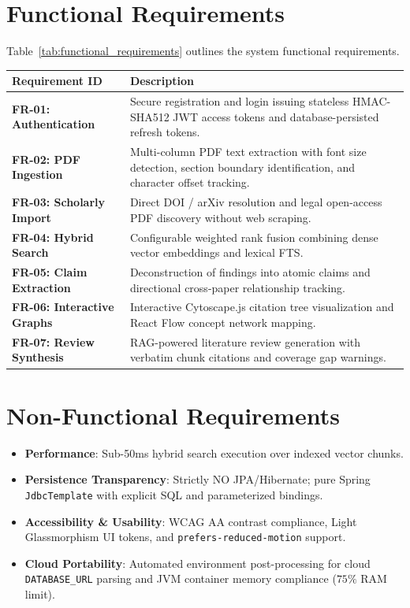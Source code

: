 \documentclass[11pt,a4paper,titlepage]{report}
\begin{document}
\section{Functional Requirements}
Table~\ref{tab:functional_requirements} outlines the system functional requirements.

\begin{center}
\label{tab:functional_requirements}
\vspace{3pt}
\begin{tabularx}{\textwidth}{lX}
\toprule
\textbf{Requirement ID} & \textbf{Description} \\
\midrule
\textbf{FR-01: Authentication} & Secure registration and login issuing stateless HMAC-SHA512 JWT access tokens and database-persisted refresh tokens. \\
\textbf{FR-02: PDF Ingestion} & Multi-column PDF text extraction with font size detection, section boundary identification, and character offset tracking. \\
\textbf{FR-03: Scholarly Import} & Direct DOI / arXiv resolution and legal open-access PDF discovery without web scraping. \\
\textbf{FR-04: Hybrid Search} & Configurable weighted rank fusion combining dense vector embeddings and lexical FTS. \\
\textbf{FR-05: Claim Extraction} & Deconstruction of findings into atomic claims and directional cross-paper relationship tracking. \\
\textbf{FR-06: Interactive Graphs} & Interactive Cytoscape.js citation tree visualization and React Flow concept network mapping. \\
\textbf{FR-07: Review Synthesis} & RAG-powered literature review generation with verbatim chunk citations and coverage gap warnings. \\
\bottomrule
\end{tabularx}
\end{center}

\section{Non-Functional Requirements}
\begin{itemize}
    \item \textbf{Performance}: Sub-50ms hybrid search execution over indexed vector chunks.
    \item \textbf{Persistence Transparency}: Strictly NO JPA/Hibernate; pure Spring \texttt{JdbcTemplate} with explicit SQL and parameterized bindings.
    \item \textbf{Accessibility \& Usability}: WCAG AA contrast compliance, Light Glassmorphism UI tokens, and \texttt{prefers-reduced-motion} support.
    \item \textbf{Cloud Portability}: Automated environment post-processing for cloud \texttt{DATABASE\_URL} parsing and JVM container memory compliance ($75\%$ RAM limit).
\end{itemize}
\end{document}
